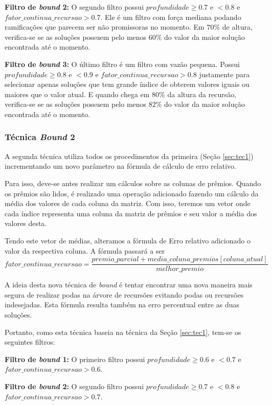\documentclass[12pt]{article}
\begin{document}
			\textbf{Filtro de \textit{bound} 2:} O segundo filtro possui $ profundidade \ge 0.7 $ e $ < 0.8 $ e $ fator\_continua\_recursao > 0.7$. Ele é um filtro com força mediana podando ramificações que parecem ser não promissoras no momento. Em $ 70\% $ de altura, verifica-se se as soluções possuem pelo menos $ 60\% $ do valor da maior solução encontrada até o momento.

			\textbf{Filtro de \textit{bound} 3:} O último filtro é um filtro com vazão pequena. Possui $ profundidade \ge 0.8 $ e $ < 0.9 $ e $ fator\_continua\_recursao > 0.8$ justamente para selecionar apenas soluções que tem grande índice de obterem valores iguais ou maiores que o valor atual. E quando chega em $ 80\% $ da altura da recursão, verifica-se se as soluções possuem pelo menos $ 82\% $ do valor da maior solução encontrada até o momento.


		\subsubsection{Técnica \textit{Bound} 2}
			A segunda técnica utiliza todos os procedimentos da primeira (Seção \ref{sec:tec1}) incrementando um novo parâmetro na fórmula de cálculo de erro relativo.

			Para isso, deve-se antes realizar um cálculos sobre as colunas de prêmios. Quando os prêmios são lidos, é realizado uma operação adicionado fazendo um cálculo da média dos valores de cada coluna da matriz. Com isso, teremos um vetor onde cada índice representa uma coluna da matriz de prêmios e seu valor a média dos valores desta.

			Tendo este vetor de médias, alteramos a fórmula de Erro relativo adicionado o valor da respectiva coluna. A fórmula passará a ser $$ fator\_continua\_recursao = \dfrac{premio\_parcial + media\_coluna\_premios[coluna\_atual]}{melhor\_premio} $$

			A ideia desta nova técnica de \textit{bound} é tentar encontrar uma nova maneira mais segura de realizar podas na árvore de recursões evitando podas ou recursões indesejadas. Esta fórmula resulta também na erro percentual entre as duas soluções.

			Portanto, como esta técnica baseia na técnica da Seção \ref{sec:tec1}, tem-se os seguintes filtros:

			\textbf{Filtro de \textit{bound} 1:} O primeiro filtro possui $ profundidade \ge 0.6 $ e $ < 0.7 $ e $ fator\_continua\_recursao > 0.6$.

			\textbf{Filtro de \textit{bound} 2:} O segundo filtro possui $ profundidade \ge 0.7 $ e $ < 0.8 $ e $ fator\_continua\_recursao > 0.7$.
\end{document}
